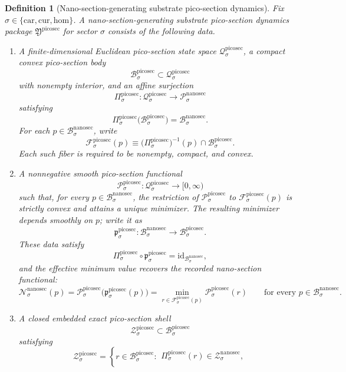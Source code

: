 \documentclass[11pt]{article}
\newcommand{\Car}{\mathrm{car}}
\newcommand{\Cur}{\mathrm{cur}}
\newcommand{\Hom}{\mathrm{hom}}
\newcommand{\NanoSectionSpace}[1]{\mathcal P_{#1}^{\mathrm{nanosec}}}
\newcommand{\NanoSectionBody}[1]{\mathcal B_{#1}^{\mathrm{nanosec}}}
\newcommand{\NanoSectionFunctional}[1]{\mathscr N_{#1}^{\mathrm{nanosec}}}
\newcommand{\NanoSectionShell}[1]{\mathcal Z_{#1}^{\mathrm{nanosec}}}
\newcommand{\PicoSectionPackage}{\mathfrak Y^{\mathrm{picosec}}}
\newcommand{\PicoSectionSpace}[1]{\mathcal Q_{#1}^{\mathrm{picosec}}}
\newcommand{\PicoSectionBody}[1]{\mathcal B_{#1}^{\mathrm{picosec}}}
\newcommand{\PicoSectionProj}[1]{\Pi_{#1}^{\mathrm{picosec}}}
\newcommand{\PicoSectionFiber}[2]{\mathcal F_{#1}^{\mathrm{picosec}}(#2)}
\newcommand{\PicoSectionNanoMin}[1]{\mathfrak p_{#1}^{\mathrm{picosec}}}
\newcommand{\PicoSectionFunctional}[1]{\mathscr P_{#1}^{\mathrm{picosec}}}
\newcommand{\PicoSectionShell}[1]{\mathcal Z_{#1}^{\mathrm{picosec}}}
\newtheorem{definition}{Definition}
\begin{document}
\begin{definition}[Nano-section-generating substrate pico-section dynamics]
\label{def:picosec}
Fix \(\sigma\in\{\Car,\Cur,\Hom\}\). A \emph{nano-section-generating substrate pico-section dynamics package} \(\PicoSectionPackage\) for sector \(\sigma\) consists of the following data.
\begin{enumerate}
    \item A finite-dimensional Euclidean pico-section state space \(\PicoSectionSpace{\sigma}\), a compact convex pico-section body
    \[
    \PicoSectionBody{\sigma}\subset\PicoSectionSpace{\sigma}
    \]
    with nonempty interior, and an affine surjection
    \[
    \PicoSectionProj{\sigma}:\PicoSectionSpace{\sigma}\to\NanoSectionSpace{\sigma}
    \]
    satisfying
    \[
    \PicoSectionProj{\sigma}\bigl(\PicoSectionBody{\sigma}\bigr)=\NanoSectionBody{\sigma}.
    \]
    For each \(p\in\NanoSectionBody{\sigma}\), write
    \[
    \PicoSectionFiber{\sigma}{p}
    \equiv
    \bigl(\PicoSectionProj{\sigma}\bigr)^{-1}(p)\cap\PicoSectionBody{\sigma}.
    \]
    Each such fiber is required to be nonempty, compact, and convex.
    \item A nonnegative smooth pico-section functional
    \[
    \PicoSectionFunctional{\sigma}:\PicoSectionSpace{\sigma}\to[0,\infty)
    \]
    such that, for every \(p\in\NanoSectionBody{\sigma}\), the restriction of \(\PicoSectionFunctional{\sigma}\) to \(\PicoSectionFiber{\sigma}{p}\) is strictly convex and attains a unique minimizer. The resulting minimizer depends smoothly on \(p\); write it as
    \[
    \PicoSectionNanoMin{\sigma}:\NanoSectionBody{\sigma}\to\PicoSectionBody{\sigma}.
    \]
    These data satisfy
    \[
    \PicoSectionProj{\sigma}\circ\PicoSectionNanoMin{\sigma}
    =
    \mathrm{id}_{\NanoSectionBody{\sigma}},
    \]
    and the effective minimum value recovers the recorded nano-section functional:
    \[
    \NanoSectionFunctional{\sigma}(p)
    =
    \PicoSectionFunctional{\sigma}\bigl(\PicoSectionNanoMin{\sigma}(p)\bigr)
    =
    \min_{r\in\PicoSectionFiber{\sigma}{p}}
    \PicoSectionFunctional{\sigma}(r)
    \qquad
    \text{for every }
    p\in\NanoSectionBody{\sigma}.
    \]
    \item A closed embedded exact pico-section shell
    \[
    \PicoSectionShell{\sigma}\subset\PicoSectionBody{\sigma}
    \]
    satisfying
    \[
    \PicoSectionShell{\sigma}
    =
    \left\{
    r\in\PicoSectionBody{\sigma}:
    \begin{array}{l}
    \PicoSectionProj{\sigma}(r)\in\NanoSectionShell{\sigma},\\[0.2em]

\end{array}\]
\end{enumerate}
\end{definition}
\end{document}
